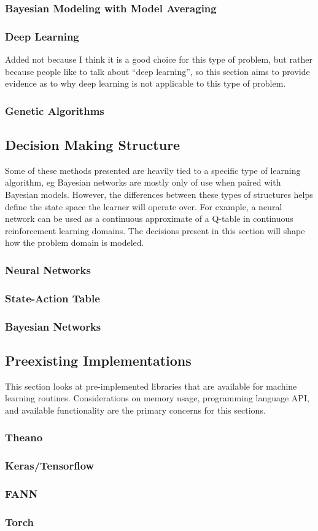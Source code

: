 \documentclass[draftclsnofoot,onecolumn,letterpaper,10pt]{IEEEtran}
\begin{document}
\subsubsection{Bayesian Modeling with Model Averaging}
\subsubsection{Deep Learning}
Added not because I think it is a good choice for this type of problem, but rather because people like to talk about ``deep learning'', so this section aims to provide evidence as to why deep learning is not applicable to this type of problem.
\subsubsection{Genetic Algorithms}


\subsection{Decision Making Structure}
Some of these methods presented are heavily tied to a specific type of learning algorithm, eg Bayesian networks are mostly only of use when paired with Bayesian models.
However, the differences between these types of structures helps define the state space the learner will operate over.
For example, a neural network can be used as a continuous approximate of a Q-table in continuous reinforcement learning domains.
The decisions present in this section will shape how the problem domain is modeled.
\subsubsection{Neural Networks}
\subsubsection{State-Action Table}
\subsubsection{Bayesian Networks}

\subsection{Preexisting Implementations}
This section looks at pre-implemented libraries that are available for machine learning routines.
Considerations on memory usage, programming language API, and available functionality are the primary concerns for this sections.
\subsubsection{Theano}
\subsubsection{Keras/Tensorflow}
\subsubsection{FANN}
\subsubsection{Torch}
\end{document}
